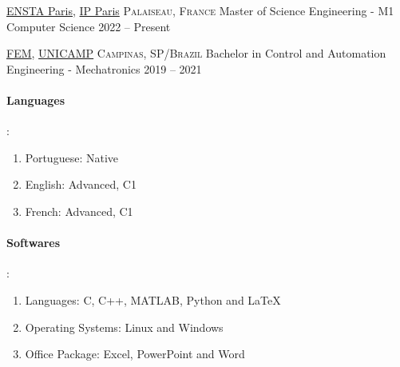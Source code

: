 \documentclass[10pt, a4paper]{article}
\begin{document}

\headedsection
    {\href{https://www.ensta-paris.fr/}{ENSTA Paris}, \href{https://www.ip-paris.fr/}{IP Paris}}
    {\textsc{Palaiseau, France}}
    {
    \headedsubsection
        {Master of Science Engineering - M1 Computer Science}
        {2022 -- Present}
        {}
    }

\headedsection
    {\href{https://www.fem.unicamp.br/index.php/pt-br/}{FEM}, \href{https://www.unicamp.br/unicamp/universidade}{UNICAMP}}
    {\textsc{Campinas, SP/Brazil}}
    {
    \headedsubsection
        {Bachelor in Control and Automation Engineering - Mechatronics}
        {2019 -- 2021}
        {\bodytext{}}
    }

\spacedhrule{0.5em}{-0.4em}



\begin{multicols}{2}
    \paragraph{Languages}:
    \begin{enumerate}
        \item Portuguese: Native
        \item English: Advanced, C1
        \item French: Advanced, C1
    \end{enumerate}
    \columnbreak
    \paragraph{Softwares}:
    \begin{enumerate}
        \item Languages: C, C++, MATLAB, Python and LaTeX
        \item Operating Systems: Linux and Windows
        \item Office Package: Excel, PowerPoint and Word
    \end{enumerate}
\end{multicols}
\end{document}
